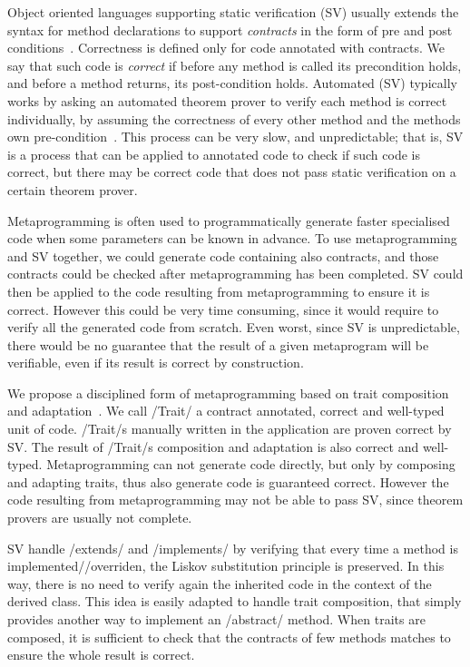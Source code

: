 \noindent Object oriented languages supporting static verification (SV) usually extends the syntax for method declarations
to support \emph{contracts} in the form of pre and post conditions~\cite{Meyer:1988:OSC:534929}.
Correctness is defined only for code annotated with contracts.
We say that such code is \emph{correct} if 
before any method is called its precondition holds, and before a method returns, its post-condition holds.
Automated (SV) typically works by asking an automated theorem prover to verify each method is correct individually, by assuming the correctness of every other method and the methods own pre-condition~\cite{barnett2004spec}. This process can be very slow, and unpredictable;
that is, SV is a process that can be applied to annotated code
to check if such code is correct, but there may be correct code that does not pass static verification
 on a certain theorem prover.

Metaprogramming is often used to programmatically generate faster specialised code 
when some parameters can be known in advance. %
To use metaprogramming and SV together, we could generate code
containing also contracts, and those contracts could be checked after metaprogramming has been completed.
SV could then be applied to the code resulting from metaprogramming to ensure it is correct.
However this could be very time consuming, since it would require to verify all the generated code from scratch.
Even worst, since SV is unpredictable, there would be no guarantee that the result of a given metaprogram will be verifiable, even if its result is correct by construction.

We propose a disciplined form of metaprogramming based on trait composition and adaptation~\cite{scharli2003traits,servetto2014meta}.
We call /Trait/ a contract annotated, correct and well-typed unit of code.
/Trait/s manually written in the application
are proven correct by SV.
The result of /Trait/s composition and adaptation is also correct and well-typed.
Metaprogramming can not generate code directly, but only by composing and adapting traits, thus also generate code is guaranteed correct.
However the code resulting from metaprogramming may not be able to pass SV, since theorem provers are usually not complete.

SV handle /extends/ and /implements/ by verifying that every 
time a method is implemented//overriden, 
the Liskov substitution principle is preserved. In this way, there is no need to verify again 
the inherited code in the context of the derived class.
This idea is easily adapted
to handle trait composition, that simply provides another way to implement an /abstract/ method.
When traits are composed,
it is sufficient
to check that the contracts of few methods matches
to ensure the whole result is correct.

